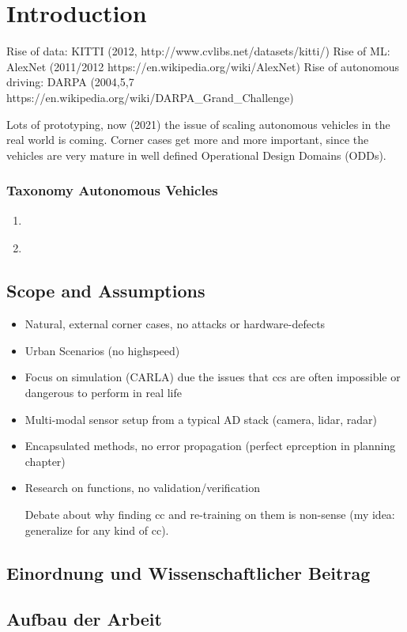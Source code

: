 \chapter{Introduction}
\label{chap:introduction}

Rise of data: KITTI (2012, http://www.cvlibs.net/datasets/kitti/)
Rise of ML: AlexNet (2011/2012 https://en.wikipedia.org/wiki/AlexNet)
Rise of autonomous driving: DARPA (2004,5,7 https://en.wikipedia.org/wiki/DARPA_Grand_Challenge)

Lots of prototyping, now (2021) the issue of scaling autonomous vehicles in the real world is coming. Corner cases get more and more important, since the vehicles are very mature in well defined Operational Design Domains (ODDs).

\subsection*{Taxonomy Autonomous Vehicles}

\begin{enumerate}
    \item \cite{sae_j3016c_2021}
    \item \cite{bundesregierung_entwurf_2021}
\end{enumerate}

\section{Scope and Assumptions}

\begin{itemize}
    \item Natural, external corner cases, no attacks or hardware-defects
\item Urban Scenarios (no highspeed)
\item Focus on simulation (CARLA) due the issues that ccs are often impossible or dangerous to perform in real life
\item Multi-modal sensor setup from a typical AD stack (camera, lidar, radar)
\item Encapsulated methods, no error propagation (perfect eprception in planning chapter)
\item Research on functions, no validation/verification

Debate about why finding cc and re-training on them is non-sense (my idea: generalize for any kind of cc).


\end{itemize}

\section{Einordnung und Wissenschaftlicher Beitrag}

\section{Aufbau der Arbeit}


